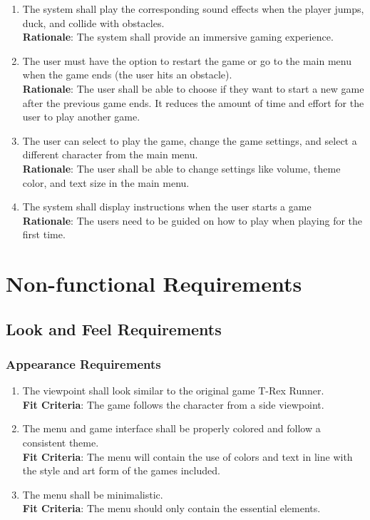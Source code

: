 \documentclass[12pt, titlepage]{article}
\begin{document}
\begin{enumerate}
	\item The system shall play the corresponding sound effects when the player jumps, duck, and collide with obstacles.\\
	\textbf{Rationale}: The system shall provide an immersive gaming experience.
	\item The user must have the option to restart the game or go to the main menu when the game ends (the user hits an obstacle).\\
	\textbf{Rationale}: The user shall be able to choose if they want to start a new game after the previous game ends. It reduces the amount of time and effort for the user to play another game.
	\item The user can select to play the game, change the game settings, and select a different character from the main menu.\\
	\textbf{Rationale}: The user shall be able to change settings like volume, theme color, and text size in the main menu. 
	\item The system shall display instructions when the user starts a game\\
	\textbf{Rationale}: The users need to be guided on how to play when playing for the first time.
\end{enumerate}

\section{Non-functional Requirements}
\subsection{Look and Feel Requirements}
\subsubsection{Appearance Requirements}
\begin{enumerate}[leftmargin=1.20cm, label={LF \arabic*}]
    \item The viewpoint shall look similar to the original game T-Rex Runner.\\
    \textbf{Fit Criteria}: The game follows the character from a side viewpoint.
    \item The menu and game interface shall be properly colored and follow a consistent theme.\\
    \textbf{Fit Criteria}: The menu will contain the use of colors and text in line with the style and art form of the games included.
    \item The menu shall be minimalistic.\\
    \textbf{Fit Criteria}: The menu should only contain the essential elements.
\end{enumerate}
\end{document}
